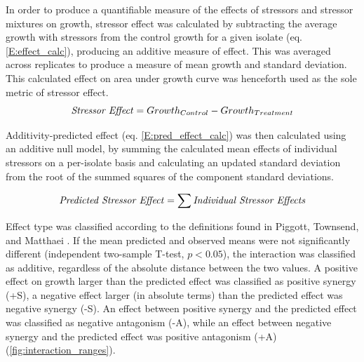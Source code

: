 \documentclass[10pt]{article}
\begin{document}
In order to produce a quantifiable measure of the effects of stressors and stressor mixtures on growth, stressor effect was calculated by subtracting the average growth with stressors from the control growth for a given isolate (eq. \ref{E:effect_calc}), producing an additive measure of effect. This was averaged across replicates to produce a measure of mean growth and standard deviation. This calculated effect on area under growth curve was henceforth used as the sole metric of stressor effect.
\begin{equation}
\text{\textit{Stressor Effect}} = Growth_{Control} - Growth_{Treatment}
\label{E:effect_calc}
\end{equation}

Additivity-predicted effect (eq. \ref{E:pred_effect_calc}) was then calculated using an additive null model, by summing the calculated mean effects of individual stressors on a per-isolate basis and calculating an updated standard deviation from the root of the summed squares of the component standard deviations.

\begin{equation}
\text{\textit{Predicted Stressor Effect}} = \sum \text{\textit{Individual Stressor Effects}}
\label{E:pred_effect_calc}
\end{equation}

Effect type was classified according to the definitions found in Piggott, Townsend, and Matthaei \cite{Piggott2015}. If the mean predicted and observed means were not significantly different (independent two-sample T-test, $p < 0.05$), the interaction was classified as additive, regardless of the absolute distance between the two values. A positive effect on growth larger than the predicted effect was classified as positive synergy (+S), a negative effect larger (in absolute terms) than the predicted effect was negative synergy (-S). An effect between positive synergy and the predicted effect was classified as negative antagonism (-A), while an effect between negative synergy and the predicted effect was positive antagonism (+A) (\cref{fig:interaction_ranges}). 
\end{document}
